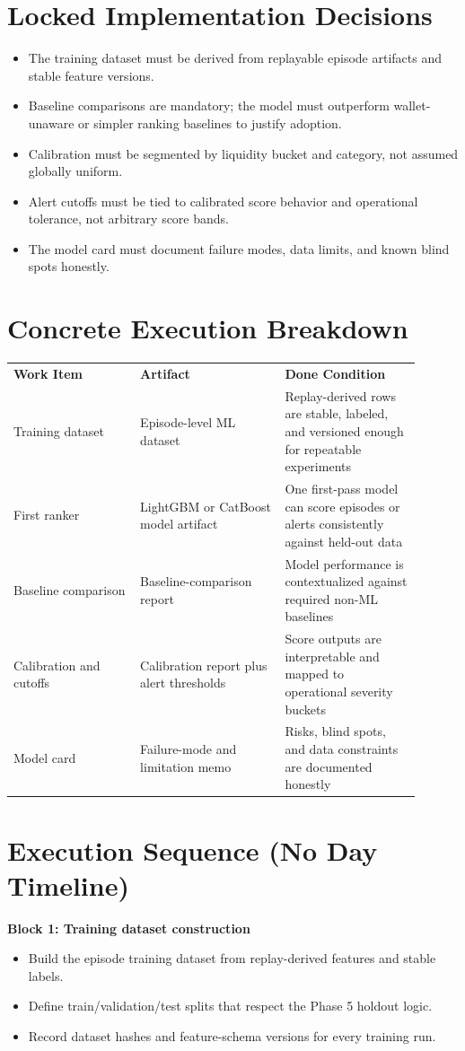 \documentclass{article}
\begin{document}
\section*{Locked Implementation Decisions}
\begin{itemize}
\item The training dataset must be derived from replayable episode artifacts and stable feature versions.
\item Baseline comparisons are mandatory; the model must outperform wallet-unaware or simpler ranking baselines to justify adoption.
\item Calibration must be segmented by liquidity bucket and category, not assumed globally uniform.
\item Alert cutoffs must be tied to calibrated score behavior and operational tolerance, not arbitrary score bands.
\item The model card must document failure modes, data limits, and known blind spots honestly.
\end{itemize}

\section*{Concrete Execution Breakdown}
\begin{longtable}{p{0.28\linewidth}p{0.32\linewidth}p{0.30\linewidth}}
\textbf{Work Item} & \textbf{Artifact} & \textbf{Done Condition} \\
Training dataset & Episode-level ML dataset & Replay-derived rows are stable, labeled, and versioned enough for repeatable experiments \\
First ranker & LightGBM or CatBoost model artifact & One first-pass model can score episodes or alerts consistently against held-out data \\
Baseline comparison & Baseline-comparison report & Model performance is contextualized against required non-ML baselines \\
Calibration and cutoffs & Calibration report plus alert thresholds & Score outputs are interpretable and mapped to operational severity buckets \\
Model card & Failure-mode and limitation memo & Risks, blind spots, and data constraints are documented honestly \\
\end{longtable}

\section*{Execution Sequence (No Day Timeline)}
\textbf{Block 1: Training dataset construction}
\begin{itemize}
\item Build the episode training dataset from replay-derived features and stable labels.
\item Define train/validation/test splits that respect the Phase 5 holdout logic.
\item Record dataset hashes and feature-schema versions for every training run.
\end{itemize}
\end{document}
